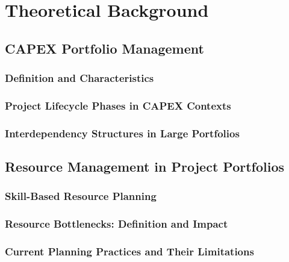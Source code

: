 \chapter{Theoretical Background}
\label{chap:background}

\section{CAPEX Portfolio Management}
\label{sec:capex_ppm}

\subsection{Definition and Characteristics}

\subsection{Project Lifecycle Phases in CAPEX Contexts}

\subsection{Interdependency Structures in Large Portfolios}

\section{Resource Management in Project Portfolios}
\label{sec:resource_management}

\subsection{Skill-Based Resource Planning}

\subsection{Resource Bottlenecks: Definition and Impact}

\subsection{Current Planning Practices and Their Limitations}

